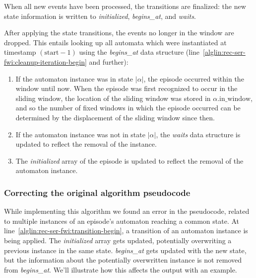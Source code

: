 When all new events have been processed, the transitions are finalized: the new state information is written to \emph{initialized}, \emph{begins\_at}, and \emph{waits}.

After applying the state transitions, the events no longer in the window are dropped. This entails looking up all automata which were instantiated at timestamp $ (\text{start} - 1) $ using the \emph{begins\_at} data structure (line~\ref{alglin:rec-ser-fwi:cleanup-iteration-begin} and further):

\begin{enumerate}
\item If the automaton instance was in state $ | \alpha | $, the episode occurred within the window until now. When the episode was first recognized to occur in the sliding window, the location of the sliding window was stored in $ \alpha \text{.in\_window} $, and so the number of fixed windows in which the episode occurred can be determined by the displacement of the sliding window since then.
\item If the automaton instance was not in state $ | \alpha | $, the \emph{waits} data structure is updated to reflect the removal of the instance.
\item The \emph{initialized} array of the episode is updated to reflect the removal of the automaton instance.
\end{enumerate}

\subsubsection{Correcting the original algorithm pseudocode}

While implementing this algorithm we found an error in the pseudocode, related to multiple instances of an episode's automaton reaching a common state. At line~\ref{alglin:rec-ser-fwi:transition-begin}, a transition of an automaton instance is being applied. The \emph{initialized} array gets updated, potentially overwriting a previous instance in the same state. \emph{begins\_at} gets updated with the new state, but the information about the potentially overwritten instance is not removed from \emph{begins\_at}. We'll illustrate how this affects the output with an example.

